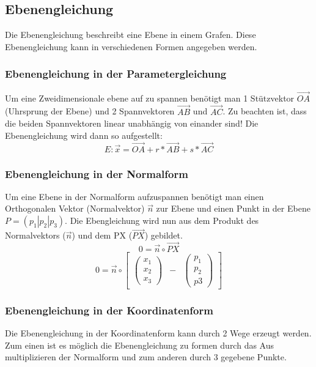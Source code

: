 \documentclass{article}
\begin{document}
\subsection{Ebenengleichung} \label{Ebenengleichungen}
Die Ebenengleichung beschreibt eine Ebene in einem Grafen. Diese Ebenengleichung kann in verschiedenen Formen angegeben werden.

\subsubsection{Ebenengleichung in der Parametergleichung}
Um eine Zweidimensionale ebene auf zu spannen benötigt man 1 Stützvektor $\vec{OA}$ (Uhrsprung der Ebene) und 2 Spannvektoren $\vec{AB}$ und $\vec{AC}$. Zu beachten ist, dass die beiden Spannvektoren linear unabhängig von einander sind!
Die Ebenengleichung wird dann so aufgestellt:
\begin{equation}
E : \vec{x} = \vec{OA} + r * \vec{AB} + s * \vec{AC}
\end{equation}

\subsubsection{Ebenengleichung in der Normalform}
Um eine Ebene in der Normalform aufzuspannen benötigt man einen Orthogonalen Vektor (Normalvektor) $\vec{n}$ zur Ebene und einen Punkt in der Ebene $P = (p_1 |p_2 | p_3)$. Die Ebengleichung wird nun aus dem Produkt des Normalvektors ($\vec{n}$) und dem PX ($\vec{PX}$) gebildet.
\begin{equation}
0 = \vec{n} \circ \vec{PX}
\end{equation} 
\begin{equation}
0 = \vec{n} \circ \begin{bmatrix} \begin{pmatrix} x_1 \\ x_2 \\ x_3 \end{pmatrix} &  - &  \begin{pmatrix} p_1 \\ p_2 \\ p3 \end{pmatrix} \end{bmatrix}
\end{equation}  

\subsubsection{Ebenengleichung in der Koordinatenform}\label{sec:Koordinatenform}
Die Ebenengleichung in der Koordinatenform kann durch 2 Wege erzeugt werden. Zum einen ist es möglich die Ebenengleichung zu formen durch das Aus multiplizieren der Normalform und zum anderen durch 3 gegebene Punkte.
\end{document}
